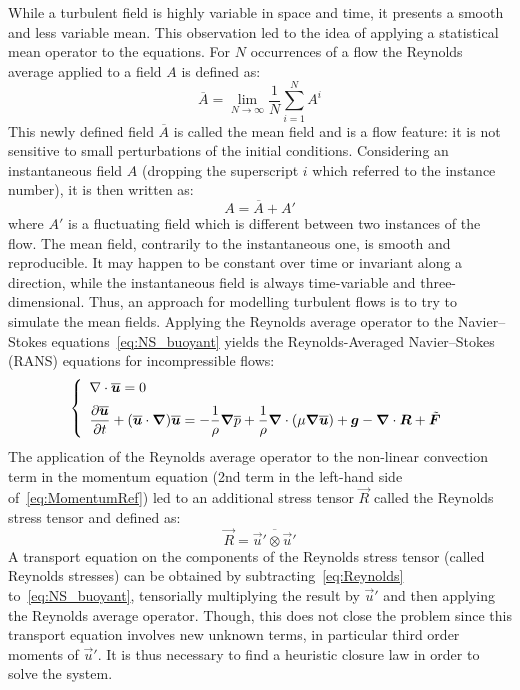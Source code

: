 While a turbulent field is highly variable in space and time, it presents a smooth and less variable mean.
This observation led to the idea of applying a statistical mean operator to the equations.
For $N$ occurrences of a flow the Reynolds average applied to a field $A$ is defined as:
\begin{equation}
  \overline A = \lim_{N \to \infty}\dfrac{1}{N}\sum_{i=1}^NA^i
\end{equation}
This newly defined field $\overline A$ is called the mean field and is a flow feature: it is not sensitive to small perturbations of the initial conditions.
Considering an instantaneous field $A$ (dropping the superscript $i$ which referred to the instance number), it is then written as:
\begin{equation}
  A = \overline A + A'
\end{equation}
where $A'$ is a fluctuating field which is different between two instances of the flow.
The mean field, contrarily to the instantaneous one, is smooth and reproducible.
It may happen to be constant over time or invariant along a direction, while the instantaneous field is always time-variable and three-dimensional.
Thus, an approach for modelling turbulent flows is to try to simulate the mean fields.
Applying the Reynolds average operator to the Navier--Stokes equations~\eqref{eq:NS_buoyant} yields the Reynolds-Averaged Navier--Stokes (RANS) equations for incompressible flows:
\begin{equation}\label{eq:Reynolds}
  \left\{
    \begin{array}{l}
      \nabla \cdot \overline{\vec{u}} = 0 \medskip \\
      \dfrac{\partial \overline{\vec{u}} }{\partial t} + (\overline{\vec{u}} \cdot \Grad)\overline{\vec{u}}=-\dfrac{1}{\rho} \vec{\nabla} \overline{p} + \dfrac{1}{\rho} \vec{\nabla} \cdot \left(\mu \Grad \overline{\vec{u}} \right)
      + \vec{g}-\vec\nabla \cdot \vec{R} + \tilde{\vec{F}}\\
    \end{array}
  \right.
\end{equation}
The application of the Reynolds average operator to the non-linear convection term in the momentum equation (2nd term in the left-hand side of~\eqref{eq:MomentumRef}) led
to an additional stress tensor $\vec{R}$ called the Reynolds stress tensor and defined as:
\begin{equation}
  \vec{R} = \overline{\vec{u}'\otimes\vec{u}'}
\end{equation}
A transport equation on the components of the Reynolds stress tensor (called Reynolds stresses) can be obtained by
subtracting~\eqref{eq:Reynolds} to~\eqref{eq:NS_buoyant}, tensorially multiplying the result by $\vec{u}'$ and then applying the Reynolds average operator.
Though, this does not close the problem since this transport equation involves new unknown terms, in particular third order moments of $\vec{u}'$.
It is thus necessary to find a heuristic closure law in order to solve the system.


